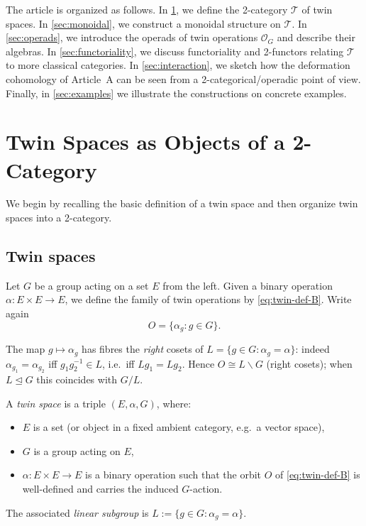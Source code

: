 \documentclass[11pt,a4paper]{article}
\numberwithin{equation}{section}
\newcommand{\TwinSpace}{(E,\alpha,G)}
\newcommand{\Twin}{\mathcal{T}}
\newcommand{\TwinOrbit}{O}
\newcommand{\LinearSubgroup}{L}
\begin{document}
	The article is organized as follows.  
	In \cref{sec:2cat}, we define the 2-category $\Twin$ of twin spaces.  
	In \cref{sec:monoidal}, we construct a monoidal structure on $\Twin$.  
	In \cref{sec:operads}, we introduce the operads of twin operations $\mathcal{O}_G$ and describe their algebras.
	In \cref{sec:functoriality}, we discuss functoriality and 2-functors relating $\Twin$ to more classical categories.
	In \cref{sec:interaction}, we sketch how the deformation cohomology of Article~A can be seen from a 2-categorical/operadic point of view.
	Finally, in \cref{sec:examples} we illustrate the constructions on concrete examples.
	
	\section{Twin Spaces as Objects of a 2-Category}
	\label{sec:2cat}
	
	We begin by recalling the basic definition of a twin space and then organize twin spaces into a 2-category.
	
	\subsection{Twin spaces}
	
	Let $G$ be a group acting on a set $E$ from the left.
	Given a binary operation $\alpha:E\times E\to E$, we define the family of twin operations
	by \eqref{eq:twin-def-B}. Write again
	\[
	\TwinOrbit = \{\alpha_g : g\in G\}.
	\]

	\begin{proposition}\label{prop:orbit}
		The map $g\mapsto\alpha_g$ has fibres the \emph{right} cosets of
		$\LinearSubgroup=\{g\in G:\alpha_g=\alpha\}$: indeed $\alpha_{g_1}=\alpha_{g_2}$
		iff $g_1 g_2^{-1}\in\LinearSubgroup$, i.e.\ iff $\LinearSubgroup g_1=\LinearSubgroup g_2$.
		Hence $\TwinOrbit\cong\LinearSubgroup\backslash G$ (right cosets); when
		$\LinearSubgroup\trianglelefteq G$ this coincides with $G/\LinearSubgroup$.
	\end{proposition}
	
	\begin{definition}
		A \emph{twin space} is a triple $\TwinSpace$, where:
		\begin{itemize}
			\item $E$ is a set (or object in a fixed ambient category, e.g.\ a vector space),
			\item $G$ is a group acting on $E$,
			\item $\alpha:E\times E\to E$ is a binary operation such that the orbit
			$\TwinOrbit$ of \eqref{eq:twin-def-B} is well-defined and carries the induced $G$-action.
		\end{itemize}
		The associated \emph{linear subgroup} is $\LinearSubgroup := \{g\in G : \alpha_g=\alpha\}$.
	\end{definition}
	
\end{document}
